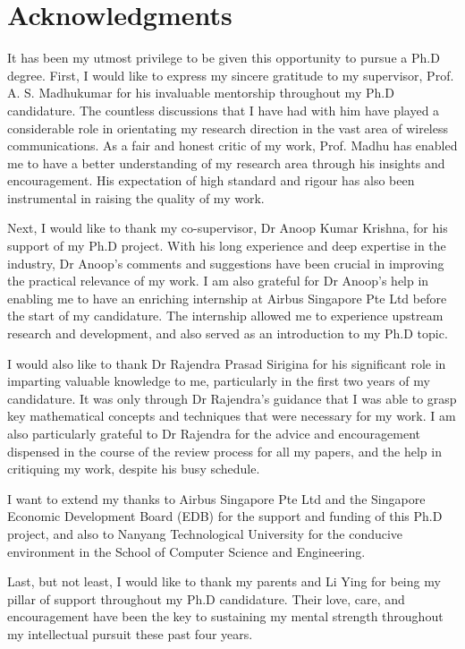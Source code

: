 \chapter* {Acknowledgments}

It has been my utmost privilege to be given this opportunity to pursue a Ph.D degree. First, I would like to express my sincere gratitude to my supervisor, Prof. A. S. Madhukumar for his invaluable mentorship throughout my Ph.D candidature. The countless discussions that I have had with him have played a considerable role in orientating my research direction in the vast area of wireless communications. As a fair and honest critic of my work, Prof. Madhu has enabled me to have a better understanding of my research area through his insights and encouragement. His expectation of high standard and rigour has also been instrumental in raising the quality of my work.

Next, I would like to thank my co-supervisor, Dr Anoop Kumar Krishna, for his support of my Ph.D project. With his long experience and deep expertise in the industry, Dr Anoop's comments and suggestions have been crucial in improving the practical relevance of my work. I am also grateful for Dr Anoop's help in enabling me to have an enriching internship at Airbus Singapore Pte Ltd before the start of my candidature. The internship allowed me to experience upstream research and development, and also served as an introduction to my Ph.D topic.

I would also like to thank Dr Rajendra Prasad Sirigina for his significant role in imparting valuable knowledge to me, particularly in the first two years of my candidature. It was only through Dr Rajendra's guidance that I was able to grasp key mathematical concepts and techniques that were necessary for my work. I am also particularly grateful to Dr Rajendra for the advice and encouragement dispensed in the course of the review process for all my papers, and the help in critiquing my work, despite his busy schedule.

I want to extend my thanks to Airbus Singapore Pte Ltd and the Singapore Economic Development Board (EDB) for the support and funding of this Ph.D project, and also to Nanyang Technological University for the conducive environment in the School of Computer Science and Engineering. 

Last, but not least, I would like to thank my parents and Li Ying for being my pillar of support throughout my Ph.D candidature. Their love, care, and encouragement have been the key to sustaining my mental strength throughout my intellectual pursuit these past four years. 



